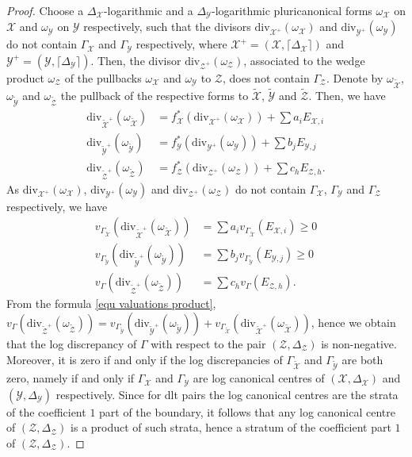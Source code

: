 \documentclass{amsart}%
\numberwithin{equation}{subsection}
\theoremstyle{plain2}
\theoremstyle{definition2}
\theoremstyle{stepstyle}
\theoremstyle{point}
\theoremstyle{subpoint}
\newcommand{\cX}{\ensuremath{\mathscr{X}}}
\newcommand{\cY}{\ensuremath{\mathscr{Y}}}
\newcommand{\cZ}{\ensuremath{\mathscr{Z}}}
\renewcommand{\cZ}{\ensuremath{\mathscr{Z}}}
\renewcommand{\cY}{\ensuremath{\mathscr{Y}}}
\newcommand{\divisor}{\mathrm{div}}
\begin{document}
\begin{proof}
Choose a $\Delta_{\cX}$-logarithmic and a $\Delta_{\cY}$-logarithmic pluricanonical forms $\omega_{\cX}$ on $\cX$ and  $\omega_{\cY}$ on $\cY$ respectively, such that the divisors $\divisor_{\cX^+}(\omega_\cX)$ and $\divisor_{\cY^+}(\omega_{\cY})$ do not contain $\Gamma_\cX$ and $\Gamma_\cY$ respectively, where $\cX^+=(\cX,\lceil \Delta_{\cX}\rceil)$ and  $\cY^+=(\cY,\lceil \Delta_{\cY}\rceil)$. Then, the divisor $\divisor_{\cZ^+}(\omega_{\cZ})$, associated to the wedge product $\omega_{\cZ}$ of the pullbacks $\omega_{\cX}$ and $\omega_{\cY}$ to $\cZ$, does not contain $\Gamma_{\cZ}$.  Denote by $\omega_{\widetilde{\cX}}$, $\omega_{\widetilde{\cY}}$ and $\omega_{\widetilde{\cZ}}$ the pullback of the respective forms to $\widetilde{\cX}$, $\widetilde{\cY}$ and $\widetilde{\cZ}$. Then, we have 
\begin{align*}
\divisor_{\widetilde{\cX}^+} (\omega_{\widetilde{\cX}})&  = f_\cX^*(\divisor_{\cX^+}(\omega_\cX)) + \sum a_i E_{\cX,i} \\
\divisor_{\widetilde{\cY}^+} (\omega_{\widetilde{\cY}})&  = f_\cY^*(\divisor_{\cY^+}(\omega_\cY)) +  \sum b_j E_{\cY,j}\\
\divisor_{\widetilde{\cZ}^+} (\omega_{\widetilde{\cZ}})&  = f_\cZ^*(\divisor_{\cZ^+}(\omega_\cZ)) +  \sum c_h E_{\cZ,h}.
\end{align*} As $\divisor_{\cX^+}(\omega_\cX)$, $\divisor_{\cY^+}(\omega_{\cY})$ and $\divisor_{\cZ^+}(\omega_{\cZ})$ do not contain $\Gamma_\cX$, $\Gamma_\cY$ and $\Gamma_{\cZ}$ respectively, we have
\begin{align*}
v_{\Gamma_{\widetilde{\cX}}}(\divisor_{\widetilde{\cX}^+} (\omega_{\widetilde{\cX}}))&  = \sum a_i v_{\Gamma_{\widetilde{\cX}}}(E_{\cX,i}) \geqslant 0 \\
v_{\Gamma_{\widetilde{\cY}}}(\divisor_{\widetilde{\cY}^+} (\omega_{\widetilde{\cY}}))&  = \sum b_j v_{\Gamma_{\widetilde{\cY}}}(E_{\cY,j}) \geqslant 0\\
v_{\Gamma}(\divisor_{\widetilde{\cZ}^+} (\omega_{\widetilde{\cZ}}))&  = \sum c_h v_{\Gamma}( E_{\cZ,h}).
\end{align*}
From the formula \ref{equ valuations product},  $v_{\Gamma}(\divisor_{\widetilde{\cZ}^+} (\omega_{\widetilde{\cZ}}))= v_{\Gamma_{\widetilde{\cY}}}(\divisor_{\widetilde{\cY}^+} (\omega_{\widetilde{\cY}}))+ v_{\Gamma_{\widetilde{\cX}}}(\divisor_{\widetilde{\cX}^+} (\omega_{\widetilde{\cX}}))$, hence we obtain that the log discrepancy of $\Gamma$ with respect to the pair $(\cZ,\Delta_{\cZ})$ is non-negative. Moreover, it is zero if and only if the log discrepancies of $\Gamma_{\widetilde{\cX}}$ and $\Gamma_{\widetilde{\cY}}$ are both zero, namely if and only if $\Gamma_\cX$ and $\Gamma_{\cY}$ are log canonical centres of $(\cX,\Delta_{\cX})$ and $(\cY,\Delta_{\cY})$ respectively. Since for dlt pairs the log canonical centres are the strata of the coefficient $1$ part of the boundary, it follows that any log canonical centre of $(\cZ,\Delta_{\cZ})$ is a product of such strata, hence a stratum of the coefficient part $1$ of $(\cZ,\Delta_{\cZ})$.
\end{proof}
\end{document}
